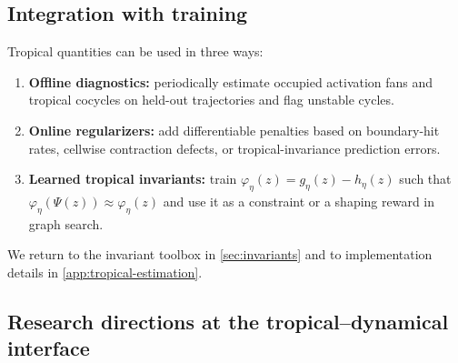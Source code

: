 \documentclass[11pt]{article}
\theoremstyle{definition}
\theoremstyle{plain}
\theoremstyle{remark}
\begin{document}
\subsection{Integration with training}
Tropical quantities can be used in three ways:
\begin{enumerate}[leftmargin=2em]
\item \textbf{Offline diagnostics:} periodically estimate occupied activation fans and tropical cocycles on held-out trajectories and flag unstable cycles.
\item \textbf{Online regularizers:} add differentiable penalties based on boundary-hit rates, cellwise contraction defects, or tropical-invariance prediction errors.
\item \textbf{Learned tropical invariants:} train $\varphi_\eta(z)=g_\eta(z)-h_\eta(z)$ such that $\varphi_\eta(\Psi(z))\approx \varphi_\eta(z)$ and use it as a constraint or a shaping reward in graph search.
\end{enumerate}

We return to the invariant toolbox in \cref{sec:invariants} and to implementation details in \cref{app:tropical-estimation}.

\subsection{Research directions at the tropical--dynamical interface}
\label{sec:tropical-research-directions}
\end{document}
